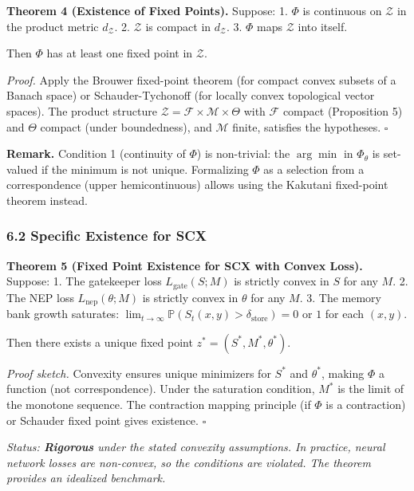\documentclass[
  12pt,
]{article}
\begin{document}
\textbf{Theorem 4 (Existence of Fixed Points).} Suppose: 1. \(\Phi\) is
continuous on \(\mathcal{Z}\) in the product metric \(d_{\mathcal{Z}}\).
2. \(\mathcal{Z}\) is compact in \(d_{\mathcal{Z}}\). 3. \(\Phi\) maps
\(\mathcal{Z}\) into itself.

Then \(\Phi\) has at least one fixed point in \(\mathcal{Z}\).

\emph{Proof.} Apply the Brouwer fixed-point theorem (for compact convex
subsets of a Banach space) or Schauder-Tychonoff (for locally convex
topological vector spaces). The product structure
\(\mathcal{Z} = \mathcal{F} \times \mathcal{M} \times \Theta\) with
\(\mathcal{F}\) compact (Proposition 5) and \(\Theta\) compact (under
boundedness), and \(\mathcal{M}\) finite, satisfies the hypotheses.
\(\square\)

\textbf{Remark.} Condition 1 (continuity of \(\Phi\)) is non-trivial:
the \(\arg\min\) in \(\Phi_\theta\) is set-valued if the minimum is not
unique. Formalizing \(\Phi\) as a selection from a correspondence (upper
hemicontinuous) allows using the Kakutani fixed-point theorem instead.

\subsubsection{6.2 Specific Existence for
SCX}\label{specific-existence-for-scx}

\textbf{Theorem 5 (Fixed Point Existence for SCX with Convex Loss).}
Suppose: 1. The gatekeeper loss \(L_{\text{gate}}(S; M)\) is strictly
convex in \(S\) for any \(M\). 2. The NEP loss
\(L_{\text{nep}}(\theta; M)\) is strictly convex in \(\theta\) for any
\(M\). 3. The memory bank growth saturates:
\(\lim_{t\to\infty} \mathbb{P}(S_t(x,y) > \delta_{\text{store}}) = 0\)
or \(1\) for each \((x,y)\).

Then there exists a unique fixed point \(z^* = (S^*, M^*, \theta^*)\).

\emph{Proof sketch.} Convexity ensures unique minimizers for \(S^*\) and
\(\theta^*\), making \(\Phi\) a function (not correspondence). Under the
saturation condition, \(M^*\) is the limit of the monotone sequence. The
contraction mapping principle (if \(\Phi\) is a contraction) or Schauder
fixed point gives existence. \(\square\)

\emph{Status: \textbf{Rigorous} under the stated convexity assumptions.
In practice, neural network losses are non-convex, so the conditions are
violated. The theorem provides an idealized benchmark.}
\end{document}
